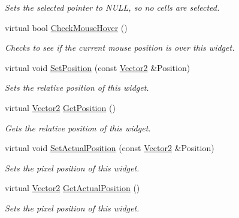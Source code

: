 \begin{DoxyCompactItemize}
\begin{DoxyCompactList}\small\item\em Sets the selected pointer to NULL, so no cells are selected. \item\end{DoxyCompactList}\item 
virtual bool \hyperlink{classphys_1_1UI_1_1CellGrid_a9c5f899c7db6c24d9aa2b03e59e5f0f0}{CheckMouseHover} ()
\begin{DoxyCompactList}\small\item\em Checks to see if the current mouse position is over this widget. \item\end{DoxyCompactList}\item 
virtual void \hyperlink{classphys_1_1UI_1_1CellGrid_abf0552ebbe369f6b695f91fdaa220c20}{SetPosition} (const \hyperlink{classphys_1_1Vector2}{Vector2} \&Position)
\begin{DoxyCompactList}\small\item\em Sets the relative position of this widget. \item\end{DoxyCompactList}\item 
virtual \hyperlink{classphys_1_1Vector2}{Vector2} \hyperlink{classphys_1_1UI_1_1CellGrid_a6b7fcbfd8a965e69c6e3e92d474f121f}{GetPosition} ()
\begin{DoxyCompactList}\small\item\em Gets the relative position of this widget. \item\end{DoxyCompactList}\item 
virtual void \hyperlink{classphys_1_1UI_1_1CellGrid_a911ce43c124ca7ac9f02ba7d8e08d919}{SetActualPosition} (const \hyperlink{classphys_1_1Vector2}{Vector2} \&Position)
\begin{DoxyCompactList}\small\item\em Sets the pixel position of this widget. \item\end{DoxyCompactList}\item 
virtual \hyperlink{classphys_1_1Vector2}{Vector2} \hyperlink{classphys_1_1UI_1_1CellGrid_a1ead8b427b5989ec137aa0ca8e017f73}{GetActualPosition} ()
\begin{DoxyCompactList}\small\item\em Sets the pixel position of this widget. \item\end{DoxyCompactList}\item 

\end{DoxyCompactItemize}
